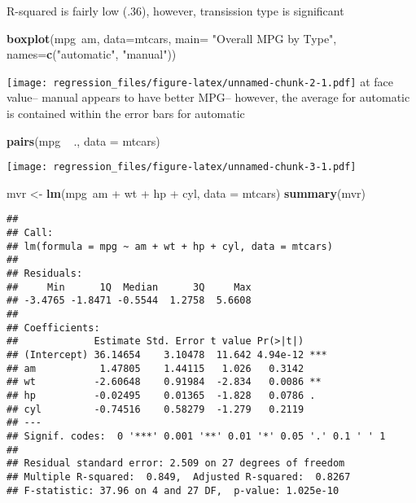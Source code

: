 \documentclass[]{article}
\newenvironment{Shaded}{\begin{snugshade}}{\end{snugshade}}
\newcommand{\KeywordTok}[1]{\textcolor[rgb]{0.13,0.29,0.53}{\textbf{{#1}}}}
\newcommand{\DataTypeTok}[1]{\textcolor[rgb]{0.13,0.29,0.53}{{#1}}}
\newcommand{\StringTok}[1]{\textcolor[rgb]{0.31,0.60,0.02}{{#1}}}
\newcommand{\NormalTok}[1]{{#1}}
\begin{document}
R-squared is fairly low (.36), however, transission type is significant

\begin{Shaded}
\begin{Highlighting}[]
\KeywordTok{boxplot}\NormalTok{(mpg~am, }\DataTypeTok{data=}\NormalTok{mtcars, }\DataTypeTok{main=} \StringTok{"Overall MPG by Type"}\NormalTok{, }\DataTypeTok{names=}\KeywordTok{c}\NormalTok{(}\StringTok{"automatic"}\NormalTok{, }\StringTok{"manual"}\NormalTok{))}
\end{Highlighting}
\end{Shaded}

\texttt{[image: regression\_files/figure-latex/unnamed-chunk-2-1.pdf]} at
face value-- manual appears to have better MPG-- however, the average
for automatic is contained within the error bars for automatic

\begin{Shaded}
\begin{Highlighting}[]
\KeywordTok{pairs}\NormalTok{(mpg ~}\StringTok{ }\NormalTok{., }\DataTypeTok{data =} \NormalTok{mtcars)}
\end{Highlighting}
\end{Shaded}

\texttt{[image: regression\_files/figure-latex/unnamed-chunk-3-1.pdf]}

\begin{Shaded}
\begin{Highlighting}[]
\NormalTok{mvr <-}\StringTok{ }\KeywordTok{lm}\NormalTok{(mpg~am +}\StringTok{ }\NormalTok{wt +}\StringTok{ }\NormalTok{hp +}\StringTok{ }\NormalTok{cyl, }\DataTypeTok{data =} \NormalTok{mtcars)}
\KeywordTok{summary}\NormalTok{(mvr)}
\end{Highlighting}
\end{Shaded}

\begin{verbatim}
## 
## Call:
## lm(formula = mpg ~ am + wt + hp + cyl, data = mtcars)
## 
## Residuals:
##     Min      1Q  Median      3Q     Max 
## -3.4765 -1.8471 -0.5544  1.2758  5.6608 
## 
## Coefficients:
##             Estimate Std. Error t value Pr(>|t|)    
## (Intercept) 36.14654    3.10478  11.642 4.94e-12 ***
## am           1.47805    1.44115   1.026   0.3142    
## wt          -2.60648    0.91984  -2.834   0.0086 ** 
## hp          -0.02495    0.01365  -1.828   0.0786 .  
## cyl         -0.74516    0.58279  -1.279   0.2119    
## ---
## Signif. codes:  0 '***' 0.001 '**' 0.01 '*' 0.05 '.' 0.1 ' ' 1
## 
## Residual standard error: 2.509 on 27 degrees of freedom
## Multiple R-squared:  0.849,  Adjusted R-squared:  0.8267 
## F-statistic: 37.96 on 4 and 27 DF,  p-value: 1.025e-10
\end{verbatim}
\end{document}
